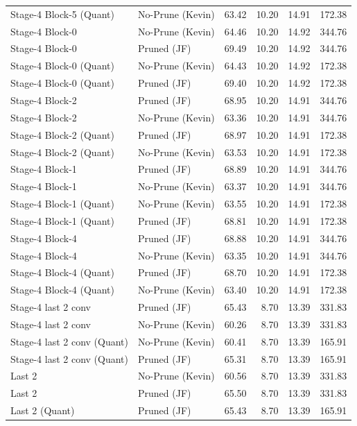 \begin{table}
\begin{tabular}{llrrrr}
Stage-4 Block-5
(Quant) & No-Prune (Kevin) & 63.42 & 10.20 & 14.91 & 172.38 \\
Stage-4 Block-0 & No-Prune (Kevin) & 64.46 & 10.20 & 14.92 & 344.76 \\
Stage-4 Block-0 & Pruned (JF) & 69.49 & 10.20 & 14.92 & 344.76 \\
Stage-4 Block-0
(Quant) & No-Prune (Kevin) & 64.43 & 10.20 & 14.92 & 172.38 \\
Stage-4 Block-0
(Quant) & Pruned (JF) & 69.40 & 10.20 & 14.92 & 172.38 \\
Stage-4 Block-2 & Pruned (JF) & 68.95 & 10.20 & 14.91 & 344.76 \\
Stage-4 Block-2 & No-Prune (Kevin) & 63.36 & 10.20 & 14.91 & 344.76 \\
Stage-4 Block-2
(Quant) & Pruned (JF) & 68.97 & 10.20 & 14.91 & 172.38 \\
Stage-4 Block-2
(Quant) & No-Prune (Kevin) & 63.53 & 10.20 & 14.91 & 172.38 \\
Stage-4 Block-1 & Pruned (JF) & 68.89 & 10.20 & 14.91 & 344.76 \\
Stage-4 Block-1 & No-Prune (Kevin) & 63.37 & 10.20 & 14.91 & 344.76 \\
Stage-4 Block-1
(Quant) & No-Prune (Kevin) & 63.55 & 10.20 & 14.91 & 172.38 \\
Stage-4 Block-1
(Quant) & Pruned (JF) & 68.81 & 10.20 & 14.91 & 172.38 \\
Stage-4 Block-4 & Pruned (JF) & 68.88 & 10.20 & 14.91 & 344.76 \\
Stage-4 Block-4 & No-Prune (Kevin) & 63.35 & 10.20 & 14.91 & 344.76 \\
Stage-4 Block-4
(Quant) & Pruned (JF) & 68.70 & 10.20 & 14.91 & 172.38 \\
Stage-4 Block-4
(Quant) & No-Prune (Kevin) & 63.40 & 10.20 & 14.91 & 172.38 \\
Stage-4 last 2 conv & Pruned (JF) & 65.43 & 8.70 & 13.39 & 331.83 \\
Stage-4 last 2 conv & No-Prune (Kevin) & 60.26 & 8.70 & 13.39 & 331.83 \\
Stage-4 last 2 conv
(Quant) & No-Prune (Kevin) & 60.41 & 8.70 & 13.39 & 165.91 \\
Stage-4 last 2 conv
(Quant) & Pruned (JF) & 65.31 & 8.70 & 13.39 & 165.91 \\
Last 2 & No-Prune (Kevin) & 60.56 & 8.70 & 13.39 & 331.83 \\
Last 2 & Pruned (JF) & 65.50 & 8.70 & 13.39 & 331.83 \\
Last 2
(Quant) & Pruned (JF) & 65.43 & 8.70 & 13.39 & 165.91 \\

\end{tabular}
\end{table}
